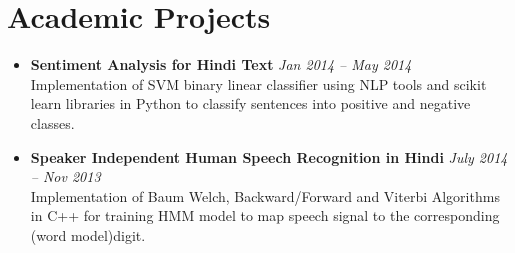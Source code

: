 \documentclass[margin,line]{resume}
\begin{document}
\begin{resume}
\begin{itemize}
    \end{itemize}



    \section{\mysidestyle Academic Projects}
    \vspace{0mm}
       \begin{itemize}
            \item \textbf{Sentiment Analysis for Hindi Text} \hfill \textsl{Jan 2014 -- May 2014}\\ Implementation of SVM binary linear classifier using NLP tools and scikit learn libraries in Python to classify sentences into positive and negative classes.
            \item \textbf{Speaker Independent Human Speech Recognition in Hindi} \hfill \textsl{July 2014 -- Nov 2013}\\ Implementation of Baum Welch, Backward/Forward and Viterbi Algorithms in C++ for training HMM model to map speech signal to the corresponding (word model)digit.
       \end{itemize}

\end{resume}
\end{document}

